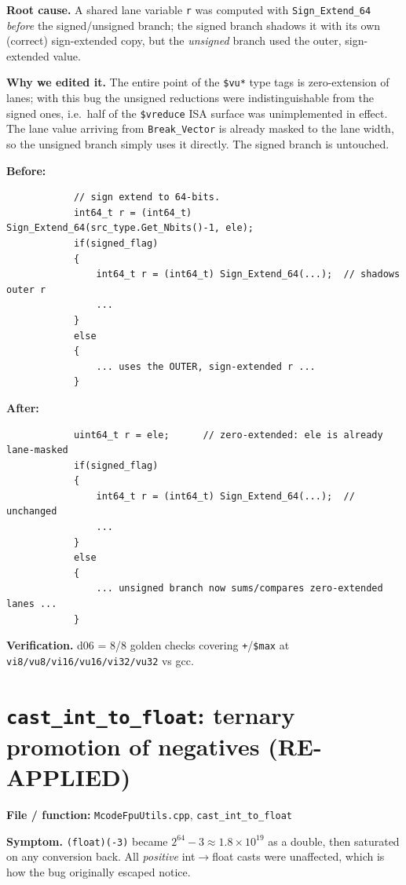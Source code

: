 \documentclass[11pt,a4paper]{report}
\begin{document}
\textbf{Root cause.} A shared lane variable \texttt{r} was computed with
\texttt{Sign\_Extend\_64} \emph{before} the signed/unsigned branch; the
signed branch shadows it with its own (correct) sign-extended copy, but the
\emph{unsigned} branch used the outer, sign-extended value.

\textbf{Why we edited it.} The entire point of the \texttt{\$vu*} type tags is
zero-extension of lanes; with this bug the unsigned reductions were
indistinguishable from the signed ones, i.e.\ half of the
\texttt{\$vreduce} ISA surface was unimplemented in effect. The lane value
arriving from \texttt{Break\_Vector} is already masked to the lane width, so
the unsigned branch simply uses it directly. The signed branch is untouched.

\textbf{Before:}
\begin{lstlisting}
            // sign extend to 64-bits.
            int64_t r = (int64_t) Sign_Extend_64(src_type.Get_Nbits()-1, ele);
            if(signed_flag)
            {
                int64_t r = (int64_t) Sign_Extend_64(...);  // shadows outer r
                ...
            }
            else
            {
                ... uses the OUTER, sign-extended r ...
            }
\end{lstlisting}

\textbf{After:}
\begin{lstlisting}
            uint64_t r = ele;      // zero-extended: ele is already lane-masked
            if(signed_flag)
            {
                int64_t r = (int64_t) Sign_Extend_64(...);  // unchanged
                ...
            }
            else
            {
                ... unsigned branch now sums/compares zero-extended lanes ...
            }
\end{lstlisting}

\textbf{Verification.} d06 = 8/8 golden checks covering
\texttt{+}/\texttt{\$max} at \texttt{vi8/vu8/vi16/vu16/vi32/vu32} vs gcc.

\section{\texttt{cast\_int\_to\_float}: ternary promotion of negatives (RE-APPLIED)}

\textbf{File / function:} \texttt{McodeFpuUtils.cpp},
\texttt{cast\_int\_to\_float}

\textbf{Symptom.} \texttt{(float)(-3)} became $2^{64}-3 \approx 1.8\times
10^{19}$ as a double, then saturated on any conversion back. All
\emph{positive} int$\to$float casts were unaffected, which is how the bug
originally escaped notice.
\end{document}

